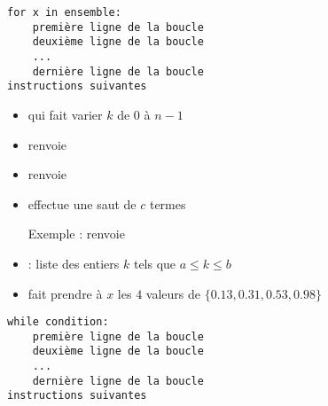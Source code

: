 \begin{frame}[fragile]

\medskip
\pause

\begin{algo}
\begin{lstlisting}
for x in ensemble:
    première ligne de la boucle
    deuxième ligne de la boucle
    ...
    dernière ligne de la boucle
instructions suivantes  
\end{lstlisting}
\end{algo}

\end{frame}


\begin{frame}

\pause
\medskip
\begin{itemize}
  \item {} 

    qui fait varier $k$ de $0$ à $n-1$
  \smallskip\pause
  \item {} renvoie \codeinline{[0,1,2,...,n-1]}
   \smallskip\pause
  \item {} renvoie \codeinline{[a,a+1,...,b-1]}
   \smallskip\pause
  \item {} effectue une saut de $c$ termes
  
   \smallskip\pause
  Exemple :  renvoie \codeinline{[0,5,10,15,...,100]}
   \smallskip\pause
  \item \codeinline{[a..b]} : liste des entiers $k$ tels que $a\le k \le b$
  
   \smallskip\pause
  \item {} 
  
  fait prendre à $x$ les $4$ valeurs
de $\{0.13 , 0.31, 0.53, 0.98\}$
\end{itemize}

\end{frame}


\begin{frame}[fragile]

\medskip
\pause

\begin{algo}
\begin{lstlisting}
while condition:
    première ligne de la boucle
    deuxième ligne de la boucle
    ...
    dernière ligne de la boucle
instructions suivantes
\end{lstlisting}
\end{algo}

\end{frame}


